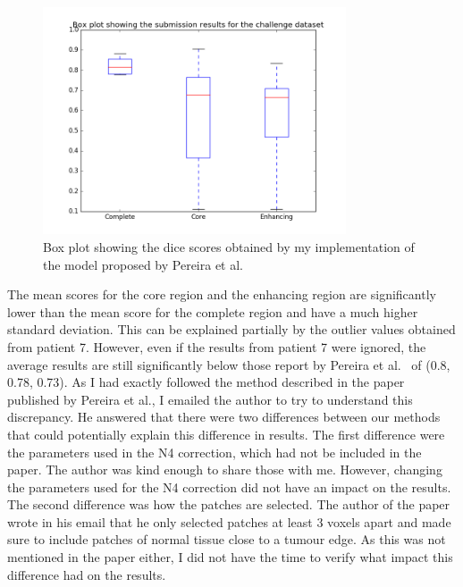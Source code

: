 \documentclass[12pt,a4paper,twoside,openright]{report}
\begin{document}
\begin{figure}
	\centering
	\label{pereira_box_plot}
	\includegraphics[width=0.8\textwidth]{pereira_box_plot}
	\caption{Box plot showing the dice scores obtained by my implementation of the model proposed by Pereira et al.}
\end{figure}

The mean scores for the core region and the enhancing region are significantly lower than the mean score for the complete region and have a much higher standard deviation. This can be explained partially by the outlier values obtained from patient 7. However, even if the results from patient 7 were ignored, the average results are still significantly below those report by Pereira et al.\ \cite{pereira} of (0.8, 0.78, 0.73). As I had exactly followed the method described in the paper published by Pereira et al., I emailed the author to try to understand this discrepancy. He answered that there were two differences between our methods that could potentially explain this difference in results. The first difference were the parameters used in the N4 correction, which had not be included in the paper. The author was kind enough to share those with me. However, changing the parameters used for the N4 correction did not have an impact on the results. The second difference was how the patches are selected. The author of the paper wrote in his email that he only selected patches at least 3 voxels apart and made sure to include patches of normal tissue close to a tumour edge. As this was not mentioned in the paper either, I did not have the time to verify what impact this difference had on the results.
\end{document}
